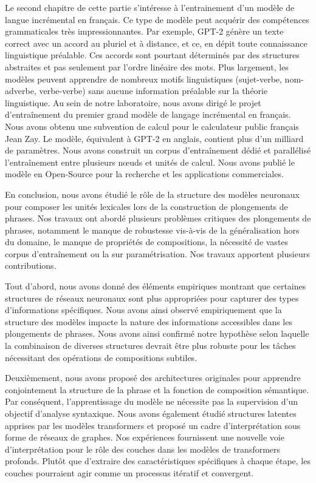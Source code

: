Le second chapitre de cette partie s’intéresse à l’entrainement d’un modèle de langue incrémental en français. Ce type de modèle peut acquérir des compétences grammaticales très impressionnantes. Par exemple, GPT-2 génère un texte correct avec un accord au pluriel et à distance, et ce, en dépit toute connaissance linguistique préalable. Ces accords sont pourtant déterminés par des structures abstraites et pas seulement par l'ordre linéaire des mots. Plus largement, les modèles peuvent apprendre de nombreux motifs linguistiques (sujet-verbe, nom-adverbe, verbe-verbe) sans aucune information préalable sur la théorie linguistique. Au sein de notre laboratoire, nous avons dirigé le projet d'entraînement du premier grand modèle de langage incrémental en français. Nous avons obtenu une subvention de calcul pour le calculateur public français Jean Zay. Le modèle, équivalent à GPT-2 en anglais, contient plus d'un milliard de paramètres. Nous avons construit un corpus d'entraînement dédié et parallélisé l'entraînement entre plusieurs nœuds et unités de calcul. Nous avons publié le modèle en Open-Source pour la recherche et les applications commerciales.

En conclusion, nous avons étudié le rôle de la structure des modèles neuronaux pour composer les unités lexicales lors de la construction de plongements de phrases. Nos travaux ont abordé plusieurs problèmes critiques des plongements de phrases, notamment le manque de robustesse vis-à-vis de la généralisation hors du domaine, le manque de propriétés de compositions, la nécessité de vastes corpus d'entraînement ou la sur paramétrisation. Nos travaux apportent plusieurs contributions. 

Tout d'abord, nous avons donné des éléments empiriques montrant que certaines structures de réseaux neuronaux sont plus appropriées pour capturer des types d'informations spécifiques. Nous avons ainsi observé empiriquement que la structure des modèles impacte la nature des informations accessibles dans les plongements de phrases. Nous avons ainsi confirmé notre hypothèse selon laquelle la combinaison de diverses structures devrait être plus robuste pour les tâches nécessitant des opérations de compositions subtiles.

Deuxièmement, nous avons proposé des architectures originales pour apprendre conjointement la structure de la phrase et la fonction de composition sémantique. Par conséquent, l'apprentissage du modèle ne nécessite pas la supervision d'un objectif d'analyse syntaxique. Nous avons également étudié structures latentes apprises par les modèles transformers et proposé un cadre d’interprétation sous forme de réseaux de graphes. Nos expériences fournissent une nouvelle voie d'interprétation pour le rôle des couches dans les modèles de transformers profonds. Plutôt que d'extraire des caractéristiques spécifiques à chaque étape, les couches pourraient agir comme un processus itératif et convergent.

